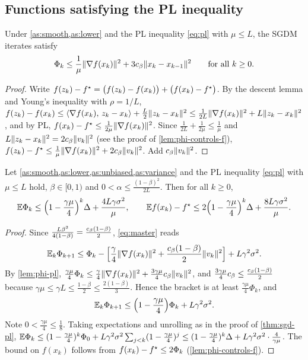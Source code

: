 \subsection{Functions satisfying the PL inequality}

\begin{lemma}\label{lem:phi-pl}
Under \cref{as:smooth,as:lower} and the PL inequality \eqref{eq:pl} with $\mu\le L$, the
SGDM iterates satisfy
\[
  \Phi_k\le\frac1\mu\lVert \nabla f(x_k)\rVert^2+3c_\beta\lVert x_k-x_{k-1}\rVert^2\qquad\text{for all }k\ge0.
\]
\end{lemma}

\begin{proof}
Write
$f(z_k)-f^\star=\bigl(f(z_k)-f(x_k)\bigr)+\bigl(f(x_k)-f^\star\bigr)$. By the descent lemma and Young's
inequality with $\rho=1/L$,
$f(z_k)-f(x_k)\le\langle \nabla f(x_k),\, z_k-x_k\rangle+\frac L2\lVert z_k-x_k\rVert^2
\le\frac1{2L}\lVert \nabla f(x_k)\rVert^2+L\lVert z_k-x_k\rVert^2$, and by PL,
$f(x_k)-f^\star\le\frac1{2\mu}\lVert \nabla f(x_k)\rVert^2$. Since $\frac1{2L}+\frac1{2\mu}\le\frac1\mu$
and $L\lVert z_k-x_k\rVert^2=2c_\beta\lVert v_k\rVert^2$ (see the proof of \cref{lem:phi-controls-f}),
$f(z_k)-f^\star\le\frac1\mu\lVert \nabla f(x_k)\rVert^2+2c_\beta\lVert v_k\rVert^2$. Add $c_\beta\lVert v_k\rVert^2$.
\end{proof}

\begin{tcolorbox}[keybox]
\begin{theorem}\label{thm:pl}
Let \cref{as:smooth,as:lower,as:unbiased,as:variance} and the PL inequality \eqref{eq:pl}
with $\mu\le L$ hold, $\beta\in[0,1)$ and $0<\alpha\le\frac{(1-\beta)^2}{2L}$. Then for all $k\ge0$,
\[
  \mathbb{E}\Phi_k\le\Bigl(1-\frac{\gamma\mu}{4}\Bigr)^k\Delta+\frac{4L\gamma\sigma^2}{\mu},
  \qquad
  \mathbb{E} f(x_k)-f^\star\le2\Bigl(1-\frac{\gamma\mu}{4}\Bigr)^k\Delta+\frac{8L\gamma\sigma^2}{\mu}.
\]
\end{theorem}
\end{tcolorbox}

\begin{proof}
Since $\frac{L\beta^2}{4(1-\beta)}=\frac{c_\beta(1-\beta)}{2}$, \eqref{eq:master} reads
\[
  \mathbb{E}_k\Phi_{k+1}\le\Phi_k-\Bigl[\frac\gamma4\lVert \nabla f(x_k)\rVert^2+\frac{c_\beta(1-\beta)}{2}\lVert v_k\rVert^2\Bigr]
  +L\gamma^2\sigma^2 .
\]
By \cref{lem:phi-pl}, $\frac{\gamma\mu}{4}\Phi_k\le\frac\gamma4\lVert \nabla f(x_k)\rVert^2+\frac{3\gamma\mu}{4}c_\beta\lVert v_k\rVert^2$,
and $\frac{3\gamma\mu}{4}c_\beta\le\frac{c_\beta(1-\beta)}{2}$ because
$\gamma\mu\le\gamma L\le\frac{1-\beta}{2}\le\frac{2(1-\beta)}{3}$. Hence the bracket is at
least $\frac{\gamma\mu}4\Phi_k$, and
\begin{equation}\label{eq:pl-contraction}
  \mathbb{E}_k\Phi_{k+1}\le\Bigl(1-\frac{\gamma\mu}4\Bigr)\Phi_k+L\gamma^2\sigma^2 .
\end{equation}
Note $0<\frac{\gamma\mu}{4}\le\frac18$. Taking expectations and unrolling as in the proof of
\cref{thm:sgd-pl},
$\mathbb{E}\Phi_k\le(1-\frac{\gamma\mu}4)^k\Phi_0+L\gamma^2\sigma^2\sum_{j<k}(1-\frac{\gamma\mu}4)^j
\le(1-\frac{\gamma\mu}4)^k\Delta+L\gamma^2\sigma^2\cdot\frac4{\gamma\mu}$. The bound on
$f(x_k)$ follows from $f(x_k)-f^\star\le2\Phi_k$ (\cref{lem:phi-controls-f}).
\end{proof}

